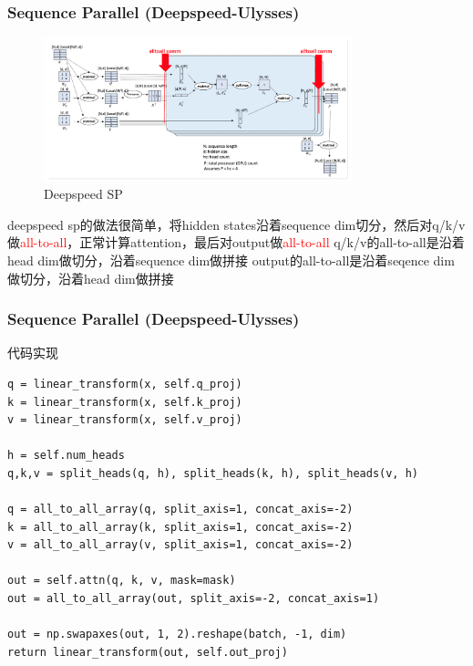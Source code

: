 \documentclass{beamer}
\begin{document}
\begin{frame}[fragile]
\frametitle{Sequence Parallel (Deepspeed-Ulysses)}

\begin{figure}[h]
    \centering
    \includegraphics[width=0.8\textwidth]{ds_ulysess.png}
    \captionsetup{labelformat=empty}
    \caption{Deepspeed SP}
\end{figure}

deepspeed sp的做法很简单，将hidden states沿着sequence dim切分，然后对q/k/v做\textcolor{red}{all-to-all}，正常计算attention，最后对output做\textcolor{red}{all-to-all}\newline
q/k/v的all-to-all是沿着head dim做切分，沿着sequence dim做拼接\newline
output的all-to-all是沿着seqence dim做切分，沿着head dim做拼接\newline

\end{frame}


\begin{frame}[fragile]
\frametitle{Sequence Parallel (Deepspeed-Ulysses)}

代码实现
\begin{verbatim}
q = linear_transform(x, self.q_proj)
k = linear_transform(x, self.k_proj)
v = linear_transform(x, self.v_proj)

h = self.num_heads
q,k,v = split_heads(q, h), split_heads(k, h), split_heads(v, h)

q = all_to_all_array(q, split_axis=1, concat_axis=-2)
k = all_to_all_array(k, split_axis=1, concat_axis=-2)
v = all_to_all_array(v, split_axis=1, concat_axis=-2)

out = self.attn(q, k, v, mask=mask)
out = all_to_all_array(out, split_axis=-2, concat_axis=1)

out = np.swapaxes(out, 1, 2).reshape(batch, -1, dim)
return linear_transform(out, self.out_proj)
\end{verbatim}

\end{frame}
\end{document}
